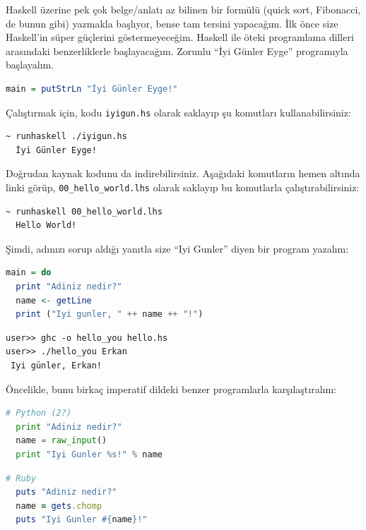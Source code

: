 \documentclass[a4paper,14pt,openany]{extbook} %
\begin{document}
Haskell üzerine pek çok belge/anlatı %
az bilinen bir formülü (quick sort, Fibonacci, de bunun gibi)
yazmakla başlıyor, bense tam tersini yapacağım.
İlk önce size Haskell'in süper güçlerini göstermeyeceğim. Haskell ile
öteki programlama dilleri arasındaki benzerliklerle başlayacağım.
Zorunlu ``İyi Günler Eyge'' programıyla başlayalım.

\begin{lstlisting}[language=Haskell]
  main = putStrLn "İyi Günler Eyge!"
\end{lstlisting}

Çalıştırmak için, kodu \lstinline!iyigun.hs! olarak saklayıp şu
komutları kullanabilirsiniz:

\begin{lstlisting}[language=shell,numbers=none,nolol]
  ~ runhaskell ./iyigun.hs
  İyi Günler Eyge!
\end{lstlisting}

Doğrudan kaynak kodunu da indirebilirsiniz. Aşağıdaki komutların hemen
altında linki görüp, \lstinline!00_hello_world.lhs! olarak saklayıp bu
komutlarla çalıştırabilirsiniz:

\begin{lstlisting}[language=shell,numbers=none,nolol]
  ~ runhaskell 00_hello_world.lhs
  Hello World!
\end{lstlisting}

Şimdi, adınızı sorup aldığı yanıtla size ``Iyi Gunler'' diyen bir
program yazalım:

\begin{lstlisting}[language=Haskell]
  main = do
  print "Adiniz nedir?"
  name <- getLine
  print ("Iyi gunler, " ++ name ++ "!")
\end{lstlisting}

\begin{lstlisting}[language=shell,numbers=none,nolol]
user>> ghc -o hello_you hello.hs
user>> ./hello_you Erkan
 Iyi günler, Erkan!
\end{lstlisting} 

Öncelikle, bunu birkaç imperatif dildeki benzer programlarla
karşılaştıralım:

\begin{lstlisting}[language=Python]
  # Python (2?)
  print "Adiniz nedir?"
  name = raw_input()
  print "Iyi Gunler %s!" % name
\end{lstlisting}

\begin{lstlisting}[language=Ruby]
  # Ruby
  puts "Adiniz nedir?"
  name = gets.chomp
  puts "Iyi Gunler #{name}!"
\end{lstlisting}
\end{document}
